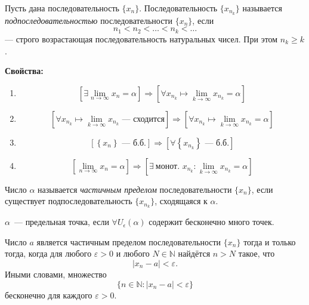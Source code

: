 
\begin{definition}
Пусть дана последовательность \(\{x_n\}\). Последовательность \(\{x_{n_k}\}\)
называется \emph{подпоследовательностью} последовательности \(\{x_n\}\), если
\[
n_1 < n_2 < \ldots < n_k < \ldots
\]
— строго возрастающая последовательность натуральных чисел. При этом \(n_k \ge k\).
\end{definition}

\textbf{Свойства:}

\begin{enumerate}
    \item
        \[
        \left[\exists \lim_{n\to\infty}x_n = \alpha\right] \Rightarrow
        \left[\forall x_{n_k} \mapsto \lim_{k\to\infty}x_{n_k} = \alpha\right]
        \]
    \item
        \[
        \left[\forall x_{n_k} \mapsto \lim_{k\to\infty}x_{n_k}
        \text{~--- сходится}\right] \Rightarrow
        \left[\forall x_{n_k} \mapsto \lim_{k\to\infty}x_{n_k} = \alpha \right]
        \]
    \item
        \[
        \left[\left\{x_n\right\}\text{~--- б.б.}\right]\Rightarrow
        \left[\forall\left\{x_{n_k}\right\}\text{~--- б.б.}\right]
        \]
    \item
        \[
        \left[\lim_{n\to\infty}x_n = \alpha\right]\Rightarrow
        \left[\exists\ \text{монот. } x_{n_k}\colon \lim_{k\to\infty}x_{n_k}
        = \alpha\right]
        \]
\end{enumerate}

\begin{definition}
Число \(\alpha\) называется \emph{частичным пределом} последовательности
\(\{x_n\}\), если существует подпоследовательность \(\{x_{n_k}\}\), сходящаяся к
\(\alpha\).
\end{definition}

\begin{definition}
    \(\alpha\)~--- предельная точка, если \(\forall U_\epsilon(\alpha)\)
    содержит бесконечно много точек.
\end{definition}

\begin{theorem}
Число \(a\) является частичным пределом последовательности \(\{x_n\}\) тогда и
только тогда, когда для любого \(\varepsilon>0\) и любого \(N\in\mathbb N\)
найдётся \(n>N\) такое, что
\[
|x_n - a| < \varepsilon.
\]
Иными словами, множество
\[
\{n\in\mathbb N: |x_n-a|<\varepsilon\}
\]
бесконечно для каждого \(\varepsilon>0\).
\end{theorem}

